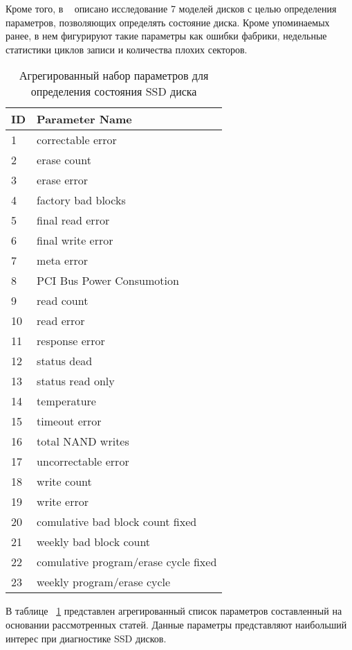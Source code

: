 Кроме того, в  ~\cite{errorpredr} описано исследование 7 моделей дисков с целью определения параметров, позволяющих определять состояние диска. Кроме упоминаемых ранее, в нем фигурируют такие параметры как ошибки фабрики, недельные статистики циклов записи и количества плохих секторов.
\begin{table}
	\captionsetup{skip=5pt}
	\caption{Агрегированный набор параметров 
		для определения состояния SSD диска}
	\centering
	\begin{tabular}{ | l | l | }
		\hline
		ID & Parameter Name \\ \hline
		1 & correctable error  \\
		2 & erase count \\
		3 & erase error \\
		4 & factory bad blocks\\
		5 & final read error\\
		6 & final write error\\
		7 & meta error\\
		8 & PCI Bus Power Consumotion\\
		9 & read count\\
		10 & read error\\
		11 & response error\\
		12 & status dead\\
		13 & status read only\\
		14 & temperature\\
		15 & timeout error\\
		16 & total NAND writes\\
		17 & uncorrectable error\\
		18 & write count\\
		19 & write error\\
		20 & comulative bad block count fixed\\
		21 & weekly bad block count\\
		22 & comulative program/erase cycle fixed\\
		23 & weekly program/erase cycle\\
		\hline
	\end{tabular}
	\label{table:tab1}
\end{table}

В таблице  ~\ref{table:tab1} представлен агрегированный список параметров составленный на основании рассмотренных статей. Данные параметры представляют наибольший интерес при диагностике SSD дисков. 
